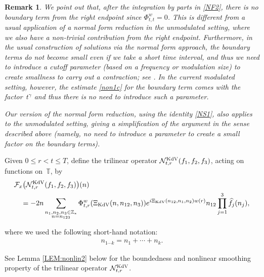 \documentclass[letterpaper, 11pt,  reqno]{amsart}
\newtheorem{remark}[theorem]{Remark}
\newcommand{\1}{\hspace{0.5mm}\text{I}\hspace{0.5mm}}
\newcommand{\noi}{\noindent}
\newcommand{\Z}{\mathbb{Z}}
\newcommand{\T}{\mathbb{T}}
\newcommand{\F}{\mathcal{F}}
\newcommand{\g}{\gamma}
\newcommand{\ft}{\widehat}
\newcommand{\NN}{\mathcal{N}}
\newcommand{\KDV}{\text{\rm KdV} }
\numberwithin{equation}{section}
\numberwithin{theorem}{section}
\begin{document}
\begin{remark}\label{REM:NFx}
\rm
We point out 
that, after the integration by parts in \eqref{NF2},  there is 
no boundary term from the right endpoint  since $\Phi^w_{t, t} = 0$.
This  is different from a usual 
application of a
normal form reduction in the unmodulated setting, 
where we also have a non-trivial contribution from 
the right endpoint.
Furthermore, 
in the usual construction of solutions via the normal form approach, 
the boundary terms do not become small even if we take
a short time interval, 
and thus we need to introduce a cutoff parameter
(based on a frequency or modulation size)
to create smallness to carry out a contraction;
see \cite{BIT, KO, GKO}.
In the current modulated setting, however, 
the estimate \eqref{non1c} for the boundary term comes with the factor~$t^\g$
and thus there is no need to introduce such a parameter.


Our version of the normal form reduction, 
using the identity \eqref{NS1}, 
also applies to the unmodulated setting, 
giving a simplification of the argument
in the sense described above
(namely, no need to introduce a parameter
to create a small factor on the boundary terms).



\end{remark}
	





Given $0 \le r <  t \le T$, 
define the trilinear operator $\NN^\KDV_{t, r}(f_1, f_2, f_3)$,  acting on functions on~$\T$, 
 by 
\begin{align}
\begin{split}
& \F_x\big(\NN^\KDV_{t, r}(f_1, f_2, f_3)\big)(n)\\
& \quad =   
- 2 n  \sum_{\substack{n_1, n_2, n_3 \in \Z_*\\n = n_{123}}}
 \Phi^w_{t, r}(\Xi_\KDV (n, n_{12}, n_3))
e^{i  \Xi_\KDV (n_{12}, n_1, n_2)w(r)}n_{12} 
\prod_{j = 1}^3\ft f_j(n_j), 
\end{split} 
\label{nox1}
\end{align}


\noi
where   we used the following short-hand notation:
\begin{align}
n_{1\cdots k} = n_1 + \cdots + n_k.
\label{no1}
\end{align}


\noi
See Lemma \ref{LEM:nonlin2} below
for the boundedness and nonlinear smoothing property
of the trilinear operator $\NN_{t, r}^\KDV$.
\end{document}
